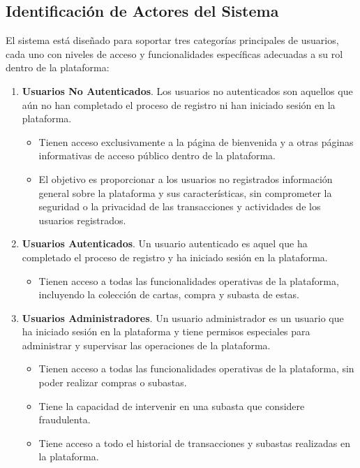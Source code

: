 \subsection{Identificación de Actores del Sistema} \label{sec:6_1-Identificacion_actores}
\hypertarget{sec:6_1-Identificacion_actores}{}

El sistema está diseñado para soportar tres categorías principales de usuarios, cada uno con niveles de acceso y funcionalidades específicas adecuadas a su rol dentro de la plataforma:
\begin{enumerate}
    \item \textbf{Usuarios No Autenticados}. 
    Los usuarios no autenticados son aquellos que aún no han completado el proceso de registro ni han iniciado sesión en la plataforma. 
    \begin{itemize}
        \item Tienen acceso exclusivamente a la página de bienvenida y a otras páginas informativas de acceso público dentro de la plataforma.
        \item El objetivo es proporcionar a los usuarios no registrados información general sobre la plataforma y sus características, sin comprometer la seguridad o la privacidad de las transacciones y actividades de los usuarios registrados.
   \end{itemize}
    
    \item \textbf{Usuarios Autenticados}.
    Un usuario autenticado es aquel que ha completado el proceso de registro y ha iniciado sesión en la plataforma.
    \begin{itemize}
        \item Tienen acceso a todas las funcionalidades operativas de la plataforma, incluyendo la colección de cartas, compra y subasta de estas.
    \end{itemize}
    
    \item \textbf{Usuarios Administradores}.
    Un usuario administrador es un usuario que ha iniciado sesión en la plataforma y tiene permisos especiales para administrar y supervisar las operaciones de la plataforma.
    \begin{itemize}
        \item Tienen acceso a todas las funcionalidades operativas de la plataforma, sin poder realizar compras o subastas.
        \item Tiene la capacidad de intervenir en una subasta que considere fraudulenta.
        \item Tiene acceso a todo el historial de transacciones y subastas realizadas en la plataforma.
    \end{itemize}
\end{enumerate}